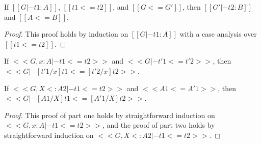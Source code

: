 \begin{lemma}
  \label{lemma:typing_for_type_precision}
  If $[[G |- t1 : A]]$, $[[t1 <= t2]]$, and $[[G <= G']]$, then $[[G' |- t2 : B]]$ and $[[A <= B]]$.
\end{lemma}
\begin{proof}
  This proof holds by induction on $[[G |- t1 : A]]$ with a case analysis over $[[t1 <= t2]]$.
\end{proof}

\begin{lemma}
  \label{lemma:substitution_for_term_precision}
  \begin{enumR}
  \item[] 
  \item If $<<G, x : A |- t1 <= t2>>$ and $<<G |- t'1 <= t'2>>$, then $<<G |- [t'1/x]t1 <= [t'2/x]t2>>$.
  \item If $<<G, X <: A2 |- t1 <= t2>>$ and $<<A1 <= A'1>>$, then $<<G |- [A1/X]t1 <= [A'1/X]t2>>$.
  \end{enumR}
\end{lemma}
\begin{proof}
  This proof of part one holds by straightforward induction on $<<G, x : A |- t1 <= t2>>$, and the
  proof of part two holds by straightforward induction on $<<G, X <: A2 |- t1 <= t2>>$.
\end{proof}

